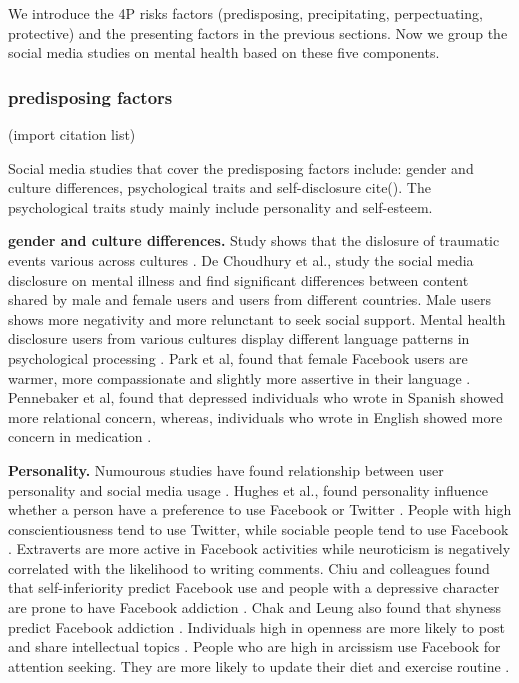 We introduce the 4P risks factors (predisposing, precipitating, perpectuating, protective) and the presenting factors in the previous sections. Now we group the social media studies on mental health based on these five components. 

\subsubsection{predisposing factors} (import citation list)

Social media studies that cover the predisposing factors include: gender and culture differences, psychological traits and self-disclosure cite(). The psychological traits study mainly include personality and self-esteem.

 \textbf{gender and culture differences.} Study shows that the dislosure of traumatic events various across cultures \cite{freitag2011talking,de2016quantifying}. De Choudhury et al., study the social media disclosure on mental illness and find significant differences between content shared by male and female users and users from different countries. Male users shows more negativity and more relunctant to seek social support. Mental health disclosure users from various cultures display different language patterns in psychological processing \cite{de_choudhury_gender_2017}. Park et al, found that female Facebook users are warmer, more compassionate and slightly more assertive in their language \cite{park_women_2016}.  Pennebaker et al, found that depressed individuals who wrote in Spanish showed more relational concern, whereas, individuals who wrote in English showed more concern in medication \cite{ramirez2008psychology}.


 \textbf{Personality.} Numourous studies have found relationship between user personality and social media usage \cite{rife_participant_2016,farnadi_computational_2016,ross_personality_2009,moore_influence_2012,back_facebook_2010,seidman_self-presentation_2013,hughes_tale_2012,hong_analysis_2014,skues_effects_2012,zhang_gratifications_2011,lee_personality_2014,jenkins-guarnieri_relationships_2012,blachnio_psychological_2013,wang2013share}. Hughes et al., found personality influence whether a person have a preference to use Facebook or Twitter \cite{hughes_tale_2012}. People with high conscientiousness tend to use Twitter, while sociable people tend to use Facebook \cite{ross_personality_2009}.  Extraverts are more active in Facebook activities while neuroticism is negatively correlated with the likelihood to writing comments. Chiu and colleagues found that self-inferiority predict Facebook use and people with a depressive character are prone to have Facebook addiction \cite{lee_personality_2014}. Chak and Leung also found that shyness predict Facebook addiction \cite{chak_shyness_2004}. Individuals high in openness are more likely to post and share intellectual topics \cite{marshall_big_2015}. People who are high in arcissism use Facebook for attention seeking. They are more likely to update their diet and exercise routine \cite{marshall_big_2015,andreassen_relationship_2017}.

